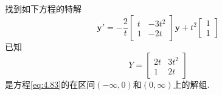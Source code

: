 \begin{example}
    找到如下方程的特解
    \begin{equation}\label{eq:4.93}
        \mathbf{y}'=-\frac{2}{t}\begin{bmatrix}
            t & -3t^2 \\
            1 & -2t
        \end{bmatrix}\mathbf{y}+t^2\begin{bmatrix}
            1 \\
            1
        \end{bmatrix}
    \end{equation}
    已知
    \[
        Y=\begin{bmatrix}
            2t & 3t^2 \\
            1  & 2t
        \end{bmatrix}
    \]是方程\ref{eq:4.83}的在区间$(-\infty,0)$和$(0,\infty)$上的解组.
\end{example}

